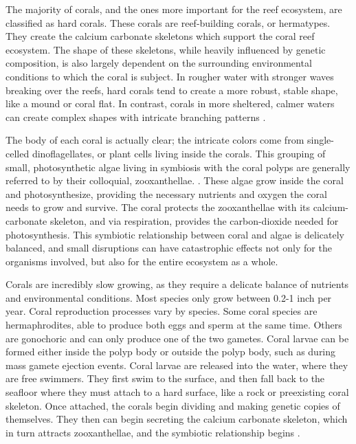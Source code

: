 \documentclass{book}\usepackage{knitr}
\begin{document}
The majority of corals, and the ones more important for the reef ecosystem, are classified as hard corals. These corals are reef-building corals, or hermatypes. They create the calcium carbonate skeletons which support the coral reef ecosystem. The shape of these skeletons, while heavily influenced by genetic composition, is also largely dependent on the surrounding environmental conditions to which the coral is subject. In rougher water with stronger waves breaking over the reefs, hard corals tend to create a more robust, stable shape, like a mound or coral flat. In contrast, corals in more sheltered, calmer waters can create complex shapes with intricate branching patterns \citep{coralreefalliance_2021}.  

The body of each coral is actually clear; the intricate colors come from single-celled dinoflagellates, or plant cells living inside the corals. This grouping of small, photosynthetic algae living in symbiosis with the coral polyps are generally referred to by their colloquial, zooxanthellae. \citep{noaa}. These algae grow inside the coral and photosynthesize, providing the necessary nutrients and oxygen the coral needs to grow and survive. The coral protects the zooxanthellae with its calcium-carbonate skeleton, and via respiration, provides the carbon-dioxide needed for photosynthesis. This symbiotic relationship between coral and algae is delicately balanced, and small disruptions can have catastrophic effects not only for the organisms involved, but also for the entire ecosystem as a whole. \citep{https://doi.org/10.1002/fee.2088}  

Corals are incredibly slow growing, as they require a delicate balance of nutrients and environmental conditions. Most species only grow between 0.2-1 inch per year. Coral reproduction processes vary by species. Some coral species are hermaphrodites, able to produce both eggs and sperm at the same time. Others are gonochoric and can only produce one of the two gametes. Coral larvae can be formed either inside the polyp body or outside the polyp body, such as during mass gamete ejection events. Coral larvae are released into the water, where they are free swimmers. They first swim to the surface, and then fall back to the seafloor where they must attach to a hard surface, like a rock or preexisting coral skeleton. Once attached, the corals begin dividing and making genetic copies of themselves. They then can begin secreting the calcium carbonate skeleton, which in turn attracts zooxanthellae, and the symbiotic relationship begins \citep{coralreefalliance_2021}.
\end{document}
